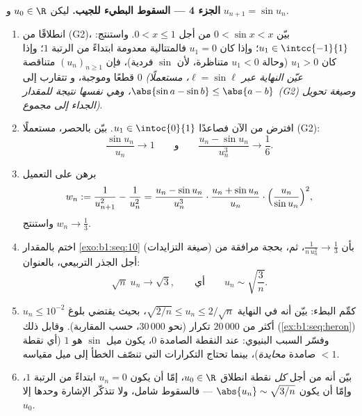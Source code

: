 \begin{problem}[{مسألة نهاية الأسبوع --- مبرهنة تشيزارو--ستولتز
والمقاربة $u_n \sim \sqrt{3/n}$ من أجل $u_{n+1} = \sin
u_n$}]
\medskip
\noindent\textbf{الجزء 4 --- السقوط البطيء للجيب.} ليكن
$u_0 \in \R$ و $u_{n+1} = \sin u_n$.
\begin{enumerate}[resume]
  \item انطلاقًا من (G2)، بيّن $0 < \sin x < x$ من أجل $0 < x \leq 1$.
        واستنتج: $u_1 \in \intcc{-1}{1}$؛ وإذا كان $u_1 = 0$ فالمتتالية
        معدومة ابتداءً من الرتبة $1$؛ وإذا كان $u_1 > 0$ (وحالة
        $u_1 < 0$ متناظرة، لأن $\sin$ فردية)، فإن
        $(u_n)_{n \geq 1}$ متناقصة قطعًا وموجبة، و
        تتقارب إلى $0$ \emph{(عيّن النهاية عبر $\ell =
        \sin \ell$، مستعملًا $\abs{\sin a - \sin b} \leq \abs{a -
        b}$، وهي نفسها نتيجة للمقدار (G2) وصيغة تحويل الجداء
        إلى مجموع)}.
  \item افترض من الآن فصاعدًا $u_1 \in \intoc{0}{1}$. بيّن بالحصر،
        مستعملًا (G2):
        \[
        \frac{\sin u_n}{u_n} \to 1
        \qquad\text{و}\qquad
        \frac{u_n - \sin u_n}{u_n^{3}} \to \frac16 .
        \]
  \item برهن على التعميل
        \[
        w_n := \frac{1}{u_{n+1}^{2}} - \frac{1}{u_n^{2}}
        = \frac{u_n - \sin u_n}{u_n^{3}} \cdot
        \frac{u_n + \sin u_n}{u_n} \cdot
        \Bigl(\frac{u_n}{\sin u_n}\Bigr)^{2},
        \]
        واستنتج $w_n \to \frac13$.
  \item اختم بالمقدار \cref{exo:b1:seq:10} (صيغة التزايدات)
        بأن $\frac{1}{n\,u_n^{2}} \to \frac13$، ثم، بحجة
        مرافقة من أجل الجذر التربيعي، بالعنوان:
        \[
        \sqrt n\;u_n \longrightarrow \sqrt 3 ,
        \qquad\text{أي}\qquad
        u_n \sim \sqrt{\frac 3n} .
        \]
  \item كمِّم البطء: بيّن أنه في النهاية $\sqrt{2/n}
        \leq u_n \leq 2/\sqrt n$، بحيث يقتضي بلوغ $u_n \leq
        10^{-2}$ أكثر من $20\,000$ تكرار (نحو
        $30\,000$، حسب المقاربة). وقابل ذلك  (\cref{ex:b1:seq:heron}) وفسّر السبب
        البنيوي: عند النقطة الصامدة $0$، يكون ميل
        $\sin$ هو $1$ (أي نقطة صامدة \emph{محايدة})، بينما
        تحتاج التكرارات التي تنصّف الخطأ إلى ميل مقياسه $< 1$.
  \item بيّن أنه من أجل \emph{كل} نقطة انطلاق $u_0 \in \R$،
        إمّا أن يكون $u_n = 0$ ابتداءً من الرتبة $1$، وإمّا أن يكون $\abs{u_n} \sim
        \sqrt{3/n}$ --- فالسقوط شامل، ولا تتذكّر الإشارة وحدها
        إلا $u_0$.
\end{enumerate}


\end{problem}
